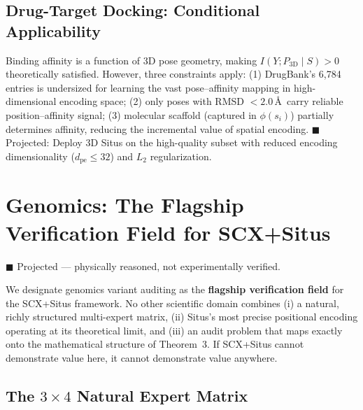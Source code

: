 \documentclass[12pt,a4paper]{article}
\begin{document}
\subsection{Drug-Target Docking: Conditional Applicability}

Binding affinity is a function of 3D pose geometry, making $I(Y; P_{\text{3D}} \mid S) > 0$ theoretically satisfied. However, three constraints apply: (1) DrugBank's 6,784 entries is undersized for learning the vast pose--affinity mapping in high-dimensional encoding space; (2) only poses with RMSD $< 2.0$\,\AA\ carry reliable position--affinity signal; (3) molecular scaffold (captured in $\phi(s_i)$) partially determines affinity, reducing the incremental value of spatial encoding. \textcolor{projected}{$\blacksquare$ Projected}: Deploy 3D Situs on the high-quality subset with reduced encoding dimensionality ($d_{\text{pe}} \leq 32$) and $L_2$ regularization.

\section{Genomics: The Flagship Verification Field for SCX+Situs}
\label{sec:genomics}

\textcolor{projected}{$\blacksquare$ Projected — physically reasoned, not experimentally verified.}

We designate genomics variant auditing as the \textbf{flagship verification field} for the SCX+Situs framework. No other scientific domain combines (i) a natural, richly structured multi-expert matrix, (ii) Situs's most precise positional encoding operating at its theoretical limit, and (iii) an audit problem that maps exactly onto the mathematical structure of Theorem~3. If SCX+Situs cannot demonstrate value here, it cannot demonstrate value anywhere.

\subsection{The $3 \times 4$ Natural Expert Matrix}
\end{document}
